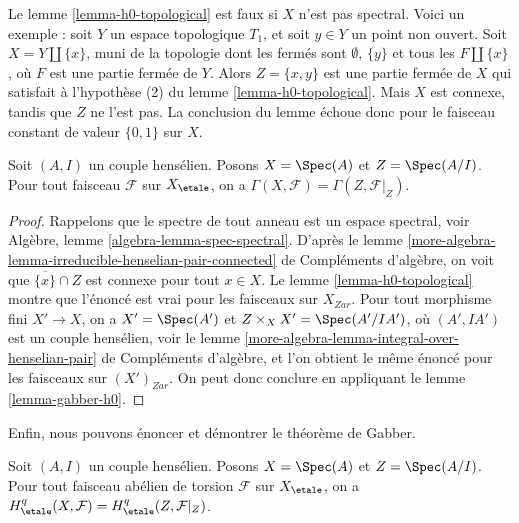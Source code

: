 \begin{example}
\label{example-quinard}
Le lemme \ref{lemma-h0-topological} est faux si $X$ n'est pas spectral.
Voici un exemple : soit $Y$ un espace topologique $T_1$, et soit
$y \in Y$ un point non ouvert. Soit $X = Y \amalg \{ x \}$, muni de
la topologie dont les fermés sont $\emptyset$, $\{y\}$ et tous les
$F \amalg \{ x \}$, où $F$ est une partie fermée de $Y$. Alors
$Z = \{x, y\}$ est une partie fermée de $X$ qui satisfait à l'hypothèse (2)
du lemme \ref{lemma-h0-topological}. Mais $X$ est connexe, tandis que $Z$ ne l'est pas.
La conclusion du lemme échoue donc pour le faisceau constant
de valeur $\{0, 1\}$ sur $X$.
\end{example}

\begin{lemma}
\label{lemma-h0-henselian-pair}
Soit $(A, I)$ un couple hensélien. Posons $X = \Spec(A)$ et
$Z = \Spec(A/I)$. Pour tout faisceau $\mathcal{F}$ sur $X_\etale$,
on a $\Gamma(X, \mathcal{F}) = \Gamma(Z, \mathcal{F}|_Z)$.
\end{lemma}

\begin{proof}
Rappelons que le spectre de tout anneau est un espace spectral, voir
Algèbre, lemme \ref{algebra-lemma-spec-spectral}. D'après le
lemme
\ref{more-algebra-lemma-irreducible-henselian-pair-connected} de Compléments d'algèbre,
on voit que $\overline{\{x\}} \cap Z$ est connexe pour tout $x \in X$.
Le lemme \ref{lemma-h0-topological} montre que l'énoncé
est vrai pour les faisceaux sur $X_{Zar}$. Pour tout morphisme fini $X' \to X$,
on a $X' = \Spec(A')$ et $Z \times_X X' = \Spec(A'/IA')$,
où $(A', IA')$ est un couple hensélien, voir le lemme
\ref{more-algebra-lemma-integral-over-henselian-pair} de Compléments d'algèbre,
et l'on obtient le même énoncé pour les faisceaux sur $(X')_{Zar}$.
On peut donc conclure en appliquant le lemme \ref{lemma-gabber-h0}.
\end{proof}

\noindent
Enfin, nous pouvons énoncer et démontrer le théorème de Gabber.

\begin{theorem}[Gabber]
\label{theorem-gabber}
Soit $(A, I)$ un couple hensélien. Posons $X = \Spec(A)$ et
$Z = \Spec(A/I)$. Pour tout faisceau abélien de torsion $\mathcal{F}$ sur $X_\etale$,
on a $H^q_\etale(X, \mathcal{F}) = H^q_\etale(Z, \mathcal{F}|_Z)$.
\end{theorem}


